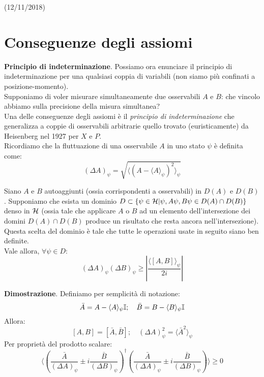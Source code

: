 \documentclass[../../FisicaTeorica.tex]{subfiles}
\begin{document}
\vspace{-1em}
\begin{center}
    \small{(12/11/2018)}
\end{center}
\section{Conseguenze degli assiomi} %
\textbf{Principio di indeterminazione}. Possiamo ora enunciare il principio di indeterminazione per una qualsiasi coppia di variabili (non siamo più confinati a posizione-momento).\\
Supponiamo di voler misurare simultaneamente due osservabili $A$ e $B$: che vincolo abbiamo sulla precisione della misura simultanea?\\
Una delle conseguenze degli assiomi è il \textit{principio di indeterminazione} che generalizza a coppie di osservabili arbitrarie quello trovato (euristicamente) da Heisenberg nel 1927 per $X$ e $P$.\\
Ricordiamo che la fluttuazione di una osservabile $A$ in uno stato $\psi$ è definita come:
\[
(\Delta A)_\psi = \sqrt{\langle(A-\langle A\rangle_\psi)^2\rangle_\psi}
\]
\begin{thm}
Siano $A$ e $B$  autoaggiunti (ossia corrispondenti a osservabili) in $D(A)$ e $D(B)$. Supponiamo che esista un dominio $D \subset \{\psi \in \mathcal{H} | \psi, A\psi, B\psi \in D(A)\cap D(B)\}$ denso in $\mathcal{H}$ 
(ossia tale che applicare $A$ o $B$ ad un elemento dell'intersezione dei domini $D(A)\cap D(B)$ produce un risultato che resta ancora nell'intersezione). Questa scelta del dominio è tale che tutte le operazioni usate in seguito siano ben definite.\\
Vale allora, $\forall \psi \in D$:
\[
(\Delta A)_\psi (\Delta B)_\psi \geq \left |\frac{\langle [A,B]\rangle_\psi}{2i} \right |
\]
\end{thm}
\textbf{Dimostrazione}. Definiamo per semplicità di notazione:
\[
\bar{A}=A-\langle A \rangle_\psi \mathbb{I}; \quad \bar{B}=B-\langle B \rangle_\psi \mathbb{I}
\]
Allora:
\[
[A,B]=[\bar{A},\bar{B}]; \quad (\Delta A)^2_\psi = \langle \bar{A}^2 \rangle_\psi
\]
Per proprietà del prodotto scalare:
\[
\langle \left(\frac{\bar{A}}{(\Delta A)_\psi}\pm i \frac{\bar{B}}{(\Delta B)_\psi} \right)^\dag \left ( \frac{\bar{A}}{(\Delta A)_\psi}\pm i \frac{\bar{B}}{(\Delta B)_\psi }\right ) \rangle \geq 0
\]
\end{document}
